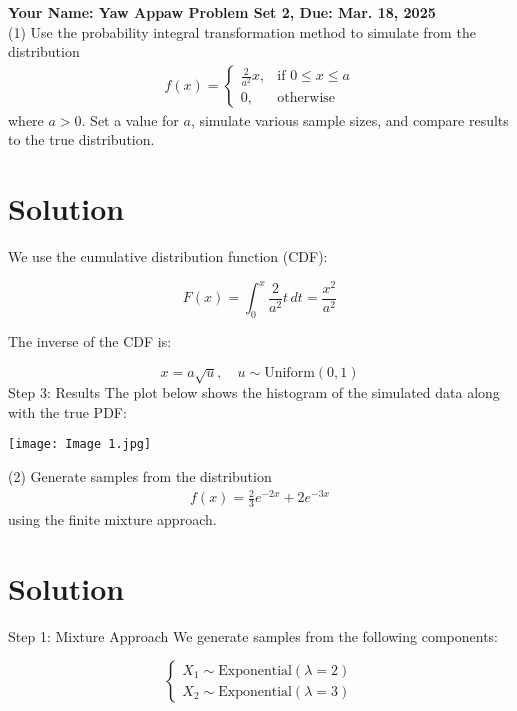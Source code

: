 \documentclass[final,11pt]{article}
\begin{document}
\thispagestyle{empty}
\begin{spacing}{1.25}

\textbf{Your Name: Yaw Appaw \hfill Problem Set 2, Due: Mar. 18, 2025}\\

(1) Use the probability integral transformation method to simulate from the distribution
\begin{gather}
    f(x) = 
    \begin{cases}
        \frac{2}{a^2}x,  & \text{if }0\leq x\leq a \\
        0, & \text{otherwise}
    \end{cases}
\end{gather}
where $a>0$. Set a value for $a$, simulate various sample sizes, and compare results to the true distribution.

\section *{Solution}
We use the cumulative distribution function (CDF):

\[
F(x) =
\int_0^x \frac{2}{a^2} t \, dt = \frac{x^2}{a^2}
\]

The inverse of the CDF is:

\[
x = a \sqrt{u}, \quad u \sim \text{Uniform}(0, 1)
\]
Step 3: Results
The plot below shows the histogram of the simulated data along with the true PDF:

\begin{center}
\texttt{[image: Image 1.jpg]}
\end{center}


\newpage

(2) Generate samples from the distribution
\begin{gather}
    f(x)=\frac{2}{3}e^{-2x}+2e^{-3x}
\end{gather}
using the finite mixture approach.

\section*{Solution}
Step 1: Mixture Approach
We generate samples from the following components:

\[
\begin{cases}
X_1 \sim \text{Exponential}(\lambda = 2) \\
X_2 \sim \text{Exponential}(\lambda = 3)
\end{cases}
\]


\end{spacing}
\end{document}
